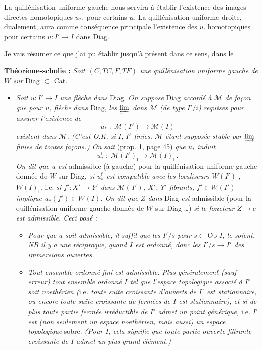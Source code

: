 La quillénisation uniforme gauche nous servira à établir l'existence des images directes homotopiques $u_{*}$, pour certains $u$. La quillénisation uniforme droite, dualement, aura comme conséquence principale l'existence des $u_{!}$ homotopiques pour certains $u : I' \longrightarrow I$ dans Diag.

Je vais résumer ce que j'ai pu établir jusqu'à présent dans ce sens, dans le

\textbf{Théorème-scholie :} \textit{Soit $(C,TC,F,TF)$ une quillénisation uniforme gauche de $W$ sur} Diag $\subset$ Cat.

\begin{itemize}[leftmargin=3em]
\item[1)] \textit{Soit $u : I' \longrightarrow I$ une flèche dans} Diag. \textit{On suppose} Diag \textit{accordé à $\mathcal{M}$ de façon que pour $u$, flèche dans} Diag, \textit{les $\varprojlim$ dans $\mathcal{M}$ (de type $I'/i$) requises pour assurer l'existence de}
\[ u_{*} \;:\; \mathcal{M}(I') \longrightarrow \mathcal{M}(I) \]
\textit{existent dans $\mathcal{M}$. (C'est O.K. si $I$, $I'$} \textit{finies, $\mathcal{M}$ étant supposée stable par $\varinjlim$ finies de toutes façons.) On sait} (prop. 1, page 45) \textit{que $u_{*}$ induit}
\[ u_{*}^{\mathrm{f}} \;:\; \mathcal{M}(I')_{\mathrm{f}} \longrightarrow \mathcal{M}(I)_{\mathrm{f}}\,. \tag*{$(*)$} \]
\textit{On dit que $u$ est} admissible (à gauche) pour la quillénisation uniforme gauche donnée de $W$ sur Diag, \textit{si $u_{*}^{\mathrm{f}}$ est compatible avec les localiseurs $W(I')_{\mathrm{f}}$, $W(I)_{\mathrm{f}}$,} i.e. \textit{si $f' : X' \longrightarrow Y'$ dans $\mathcal{M}(I')$, $X'$, $Y'$ fibrants, $f' \in W(I')$ implique $u_{*}(f') \in W(I)$. On dit que $Z$ dans} Diag \textit{est} admissible (pour la quillénisation uniforme gauche donnée de $W$ sur Diag \dots) \textit{si le foncteur $Z \longrightarrow e$ est admissible. Ceci posé :}
\begin{itemize}[leftmargin=2.5em]
\item[a)] \textit{Pour que $u$ soit admissible, il suffit que les $I'/s$ pour $s \in \operatorname{Ob} I$, le soient. NB il y a une réciproque, quand $I$ est ordonné, donc les $I'/s \longrightarrow I'$ des immersions ouvertes.}
\item[b)] \textit{Tout ensemble ordonné fini est admissible. Plus généralement (sauf erreur) tout ensemble ordonné $I$ tel que l'espace topologique associé à $I^{\circ}$ soit noethérien (}i.e. \textit{toute suite croissante d'ouverts de $I^{\circ}$ est stationnaire, ou encore toute suite croissante de fermées de $I$ est stationnaire), et si de plus toute partie fermée irréductible de $I^{\circ}$ admet un point générique,} i.e. \textit{$I^{\circ}$ est (non seulement un espace noethérien, mais aussi) un espace topologique} sobre. \textit{(Pour $I$, cela signifie que toute partie ouverte filtrante croissante de $I$ admet un plus grand élément.)} %
\end{itemize}
\end{itemize}


